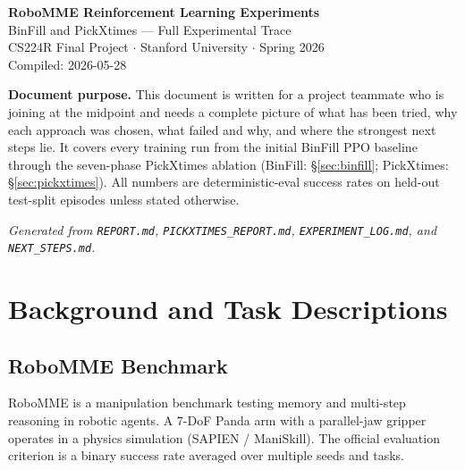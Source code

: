 \documentclass[11pt,letterpaper]{article}
\begin{document}
\begin{titlepage}
  \centering
  \vspace*{1.5cm}
  {\LARGE\bfseries\color{darkblue} RoboMME Reinforcement Learning Experiments}\\[0.4em]
  {\large\color{gray} BinFill and PickXtimes — Full Experimental Trace}\\[2em]
  {\normalsize CS224R Final Project $\cdot$ Stanford University $\cdot$ Spring 2026}\\[1em]
  {\normalsize Compiled: 2026-05-28}\\[3em]

  \begin{mdframed}[backgroundcolor=lightgray,linecolor=gray!50]
  \textbf{Document purpose.}
  This document is written for a project teammate who is joining at
  the midpoint and needs a complete picture of what has been tried,
  why each approach was chosen, what failed and why, and where the
  strongest next steps lie. It covers every training run from the
  initial BinFill PPO baseline through the seven-phase PickXtimes
  ablation (BinFill: §\ref{sec:binfill}; PickXtimes: §\ref{sec:pickxtimes}).
  All numbers are deterministic-eval success rates on held-out
  test-split episodes unless stated otherwise.
  \end{mdframed}

  \vfill
  {\small\textit{Generated from \texttt{REPORT.md}, \texttt{PICKXTIMES\_REPORT.md},
  \texttt{EXPERIMENT\_LOG.md}, and \texttt{NEXT\_STEPS.md}.}}
\end{titlepage}

\tableofcontents
\newpage

\section{Background and Task Descriptions}
\label{sec:background}

\subsection{RoboMME Benchmark}

RoboMME is a manipulation benchmark testing memory and multi-step reasoning
in robotic agents. A 7-DoF Panda arm with a parallel-jaw gripper operates in
a physics simulation (SAPIEN / ManiSkill). The official evaluation criterion
is a binary success rate averaged over multiple seeds and tasks.
\end{document}
